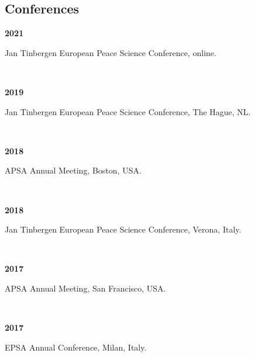 \documentclass[a4paper, 12pt]{article}
\begin{document}
\subsection*{Conferences}


\begin{minipage}[t]{0.1\textwidth}
\textbf{2021}
\end{minipage}\hfill\begin{minipage}[t]{0.9\textwidth}
Jan Tinbergen European Peace Science Conference, online.
\end{minipage}\\
\begin{minipage}[t]{0.1\textwidth}
\textbf{2019}
\end{minipage}\hfill\begin{minipage}[t]{0.9\textwidth}
Jan Tinbergen European Peace Science Conference, The Hague, NL.
\end{minipage}\\
\begin{minipage}[t]{0.1\textwidth}
\textbf{2018}
\end{minipage}\hfill
\begin{minipage}[t]{0.9\textwidth}
APSA Annual Meeting, Boston, USA.
\end{minipage}\\
\begin{minipage}[t]{0.1\textwidth}
\textbf{2018}
\end{minipage}\hfill
\begin{minipage}[t]{0.9\textwidth}
Jan Tinbergen European Peace Science Conference, Verona, Italy.
\end{minipage}\\
\begin{minipage}[t]{0.1\textwidth}
\textbf{2017}
\end{minipage}\hfill
\begin{minipage}[t]{0.9\textwidth}
APSA Annual Meeting, San Francisco, USA.
\end{minipage}\\
\begin{minipage}[t]{0.1\textwidth}
\textbf{2017}
\end{minipage}\hfill
\begin{minipage}[t]{0.9\textwidth}
EPSA Annual Conference, Milan, Italy.
\end{minipage}
\end{document}

